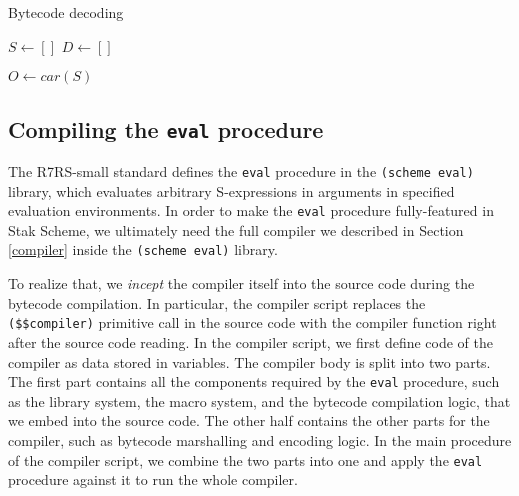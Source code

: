 \documentclass[sigplan, anonymous, review]{acmart}
\begin{document}
\begin{algorithm}
  \caption{Bytecode decoding}
  \label{algorithm:decode}


  $S \gets []$ \;
  $D \gets []$ \;

  $O \gets car(S)$ \;
\end{algorithm}

\subsection{Compiling the \texttt{eval} procedure} \label{inception}

The R7RS-small standard defines the \texttt{eval} procedure in the
\texttt{(scheme eval)} library, which evaluates arbitrary S-expressions in
arguments in specified evaluation environments.
In order to make the \texttt{eval} procedure fully-featured in Stak Scheme, we
ultimately need the full compiler we described in Section
\ref{compiler} inside the \texttt{(scheme eval)} library.

To realize that, we \textit{incept} the compiler itself into the
source code during the bytecode compilation.
In particular, the compiler script replaces
the \texttt{(\$\$compiler)} primitive call in the source code
with the compiler function right after the source code reading.
In the compiler script, we first define code of the compiler as
data stored in variables.
The compiler body is split into two parts.
The first part contains all the components required by the \texttt{eval}
procedure, such as the library system, the macro system, and the
bytecode compilation logic, that we embed into the source code.
The other half contains the other parts for the compiler, such
as bytecode marshalling and encoding logic.
In the main procedure of the compiler script, we combine the two
parts into one and apply the \texttt{eval} procedure against it to
run the whole compiler.
\end{document}
